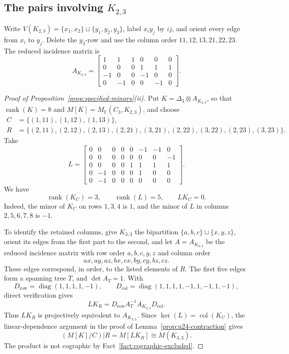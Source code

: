 \documentclass[12pt,a4paper]{article}
\numberwithin{equation}{section}
\DeclareMathOperator{\rank}{rank}
\DeclareMathOperator{\col}{col}
\DeclareMathOperator{\diag}{diag}
\newcommand{\F}{\mathbb F}
\theoremstyle{definition}
\theoremstyle{remark}
\begin{document}
\subsection{The pairs involving \texorpdfstring{\(K_{2,3}\)}{K2,3}}
Write \(V(K_{2,3})=\{x_1,x_2\}\sqcup\{y_1,y_2,y_3\}\),
label \(x_i y_j\) by \(ij\), and orient every edge from \(x_i\)
to \(y_j\).  Delete the \(y_3\)-row and use the column order
\(11,12,13,21,22,23\).  The reduced incidence matrix is
\[
 A_{K_{2,3}}=\begin{bmatrix}
 1&1&1&0&0&0\\0&0&0&1&1&1\\-1&0&0&-1&0&0\\0&-1&0&0&-1&0
 \end{bmatrix}.
\]

\begin{proof}[Proof of Proposition~\ref{prop:specified-minors}\textup{(ii)}]
Put \(K=\Delta_3\otimes A_{K_{2,3}}\), so that
\(\rank(K)=8\) and \(M[K]=M_{\F}(C_3,K_{2,3})\), and choose
\[
\begin{aligned}
 C&=\{(1,11),(1,12),(1,13)\},\\
 R&=\{(2,11),(2,12),(2,13),(2,21),(3,21),(2,22),(3,22),(2,23),(3,23)\}.
\end{aligned}
\]
Take
\[
 L=\begin{bmatrix}
0&0&0&0&0&-1&-1&0\\
0&0&0&0&0&0&0&-1\\
0&0&0&0&1&1&1&1\\
0&-1&0&0&0&1&0&0\\
0&-1&0&0&0&0&0&0
\end{bmatrix}.
\]
We have
\[
 \rank(K_C)=3,\qquad \rank(L)=5,\qquad LK_C=0.
\]
Indeed, the minor of \(K_C\) on rows \(1,3,4\) is \(1\), and
the minor of \(L\) in columns \(2,5,6,7,8\) is \(-1\).

To identify the retained columns, give \(K_{3,3}\) the bipartition
\(\{a,b,c\}\sqcup\{x,y,z\}\), orient its edges from the first
part to the second, and let \(A=A_{K_{3,3}}\) be the reduced incidence
matrix with row order \(a,b,c,y,z\) and column order
\[
 ax,ay,az,bx,cx,by,cy,bz,cz.
\]
These edges correspond, in order, to the listed elements of \(R\).
The first five edges form a spanning tree \(T\), and
\(\det A_T=1\).  With
\[
 D_{\mathrm{row}}=\diag(1,1,1,1,-1),\qquad
 D_{\mathrm{col}}=\diag(1,1,1,1,-1,1,-1,1,-1),
\]
direct verification gives
\[
 LK_R=D_{\mathrm{row}}A_T^{-1}A_{K_{3,3}}D_{\mathrm{col}}.
\]
Thus \(LK_R\) is projectively equivalent to \(A_{K_{3,3}}\).
Since \(\ker(L)=\col(K_C)\), the linear-dependence argument in
the proof of Lemma~\ref{prop:u24-contraction} gives
\[
 (M[K]/C)|R=M[LK_R]\cong M(K_{3,3}).
\]
The product is not cographic by Fact~\ref{fact:cographic-excluded}.
\end{proof}
\end{document}
